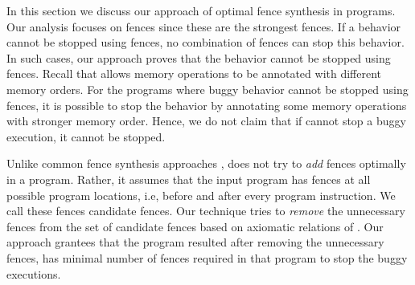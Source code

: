 

In this section we discuss our approach of optimal \mosc fence synthesis 
in \cc programs. 
Our analysis focuses on \mosc fences since these are the strongest \cc 
fences. If a behavior cannot be stopped using \mosc fences, no combination 
of \cc fences can stop this behavior. 
In such cases, our approach proves that the behavior cannot be 
stopped using \cc fences.
Recall that \cc allows memory operations to be annotated with different 
memory orders. For the programs where buggy behavior cannot be stopped 
using fences, it is possible to stop the behavior by annotating some 
memory operations with stronger memory order.
Hence, we do not claim that if \ourtechnique cannot stop a buggy \cc 
execution, it cannot be stopped.

Unlike common fence synthesis approaches , 
\ourtechnique does not try to \emph{add} fences optimally in a program.
Rather, it assumes that the input program has \mosc 
fences at all possible program locations, i.e, before and after every 
program instruction. We call these fences candidate fences. Our technique 
tries to \emph{remove} the unnecessary fences from the set of candidate 
fences based on axiomatic relations of \cc. 
Our approach grantees that the program resulted after removing the 
unnecessary fences, has minimal number of \mosc fences required in that 
program to stop the buggy executions. 

